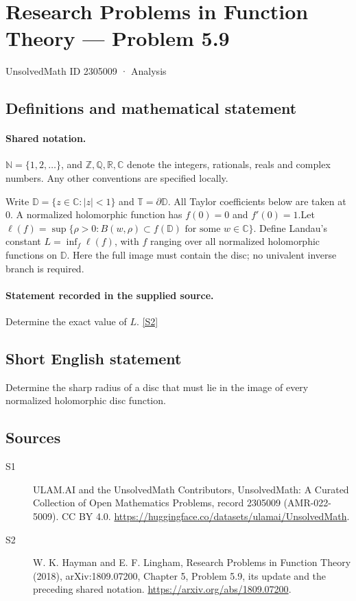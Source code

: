 \documentclass[11pt]{article}
\newcommand{\sref}[2]{\hyperlink{source:#1:#2}{[S#2]}}
\begin{document}
\setcounter{section}{2305008}
\section{Research Problems in Function Theory — Problem 5.9}\label{2305009}
{\small\sffamily UnsolvedMath ID 2305009 · Analysis}
\subsection{Definitions and mathematical statement}

\paragraph{Shared notation.}$\mathbb N=\{1,2,\ldots\}$, and $\mathbb Z,\mathbb Q,\mathbb R,\mathbb C$ denote the integers, rationals, reals and complex numbers. Any other conventions are specified locally.


Write $\mathbb D=\{z\in\mathbb C:|z|<1\}$ and $\mathbb T=\partial\mathbb D$. All Taylor coefficients below are taken at $0$. A normalized holomorphic function has $f(0)=0$ and $f'(0)=1$.Let $\ell(f)=\sup\{\rho>0:B(w,\rho)\subset f(\mathbb D)\text{ for some }w\in\mathbb C\}$. Define Landau's constant $L=\inf_f\ell(f)$, with $f$ ranging over all normalized holomorphic functions on $\mathbb D$. Here the full image must contain the disc; no univalent inverse branch is required.
\paragraph{Statement recorded in the supplied source.}
Determine the exact value of $L$. \sref{2305009}{2}
\subsection{Short English statement}
Determine the sharp radius of a disc that must lie in the image of every normalized holomorphic disc function.
\subsection{Sources}
\begin{description}
\item[\hypertarget{source:2305009:1}{S1}] ULAM.AI and the UnsolvedMath Contributors, UnsolvedMath: A Curated Collection of Open Mathematics Problems, record 2305009 (AMR-022-5009). CC BY 4.0. \url{https://huggingface.co/datasets/ulamai/UnsolvedMath}.
\item[\hypertarget{source:2305009:2}{S2}] W. K. Hayman and E. F. Lingham, Research Problems in Function Theory (2018), arXiv:1809.07200, Chapter 5, Problem 5.9, its update and the preceding shared notation. \url{https://arxiv.org/abs/1809.07200}.
\end{description}
\label{end:2305009}
\end{document}
